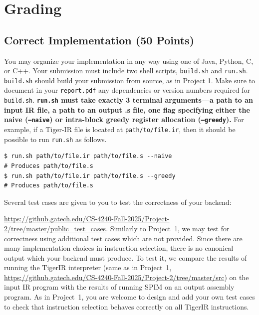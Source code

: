 \documentclass[12pt]{article}
\begin{document}
\section{Grading}
\label{sec:grading}

\subsection{Correct Implementation (50 Points)}
\label{sec:correct}
You may organize your implementation in any way using one of Java, Python, C, or C++. Your submission must include two shell scripts, \texttt{build.sh} and \texttt{run.sh}. \texttt{build.sh} should build your submission from source, as in Project 1. Make sure to document in your \texttt{report.pdf} any dependencies or version numbers required for \texttt{build.sh}. \textbf{\texttt{run.sh} must take exactly 3 terminal arguments---a path to an input IR file, a path to an output .s file, one flag specifying either the naive (\texttt{--naive}) or intra-block greedy register allocation (\texttt{--greedy}).} For example, if a Tiger-IR file is located at \texttt{path/to/file.ir}, then it should be possible to run \texttt{run.sh} as follows.
\begin{lstlisting}[]
$ run.sh path/to/file.ir path/to/file.s --naive
# Produces path/to/file.s
$ run.sh path/to/file.ir path/to/file.s --greedy
# Produces path/to/file.s
\end{lstlisting}


Several test cases are given to you to test the correctness of your backend:

\url{https://github.gatech.edu/CS-4240-Fall-2025/Project-2/tree/master/public_test_cases}. Similarly to Project~1, we may test for correctness using additional test cases which are not provided. Since there are many implementation choices in instruction selection, there is no canonical output which your backend must produce. To test it, we compare the results of running the TigerIR interpreter (same as in Project~1, \url{https://github.gatech.edu/CS-4240-Fall-2025/Project-2/tree/master/src}) on the input IR program with the results of running SPIM on an output assembly program. As in Project~1, you are welcome to design and add your own test cases to check that instruction selection behaves correctly on all TigerIR instructions.
\end{document}
